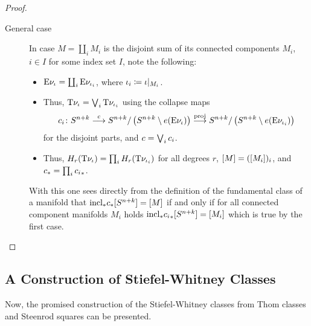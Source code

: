 \begin{Lem}
\begin{proof}
\begin{description}
    \item[General case] In case $M=\coprod_i M_i$ is the disjoint sum of its connected
      components $M_i$, $i\in I$ for some index set $I$, note the following:
      \begin{itemize}
      \item $\mathrm{E}\nu_{{\iota}} = \coprod_i\mathrm{E}\nu_{{\iota}_i}$,
        where ${\iota}_i\coloneqq{\iota}|_{M_i}$.
      \item Thus, $\mathrm{T}{\nu_{{\iota}}} = \bigvee_i\mathrm{T}{\nu_{{\iota}_i}}$ using the
        collapse maps
        \begin{gather*}
          c_i\colon
          S^{n+k}
          \overset{c}{\longrightarrow}
          S^{n+k}/\left(S^{n+k}\setminus e(\mathrm{E}\nu_{{\iota}})\right)
          \overset{\mathrm{proj}}{\longrightarrow}
          S^{n+k}/\left(S^{n+k}\setminus e(\mathrm{E}\nu_{{\iota}_i})\right)
        \end{gather*}
        for the disjoint parts,
        and $c=\bigvee_ic_i$.
      \item Thus, $H_r(\mathrm{T}{\nu_{{\iota}}}) = \prod_i H_r(\mathrm{T}{\nu_{{\iota}_i}})$ for
        all degrees $r$, $[M] = ([M_i])_i$, and
        ${c}_* = \prod_i{c_i}_*$.
      \end{itemize}
      With this one sees directly from the definition of the fundamental
      class of a manifold that
      ${\mathrm{incl}}_*{c}_*[S^{n+k}] = [M]$
      if and only if for all connected component manifolds $M_i$ holds
      ${\mathrm{incl}}_*{c_i}_*[S^{n+k}] = [M_i]$
      which is true by the first case.
      \qedhere
    \end{description}
  \end{proof}
\end{Lem}

\subsection{A Construction of Stiefel-Whitney Classes}
Now, the promised construction of the Stiefel-Whitney classes from
Thom classes and Steenrod squares can be presented.

